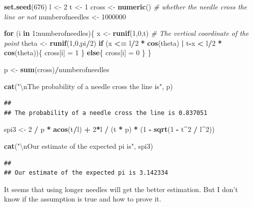 \documentclass[]{article}
\newenvironment{Shaded}{\begin{snugshade}}{\end{snugshade}}
\newcommand{\KeywordTok}[1]{\textcolor[rgb]{0.13,0.29,0.53}{\textbf{#1}}}
\newcommand{\DecValTok}[1]{\textcolor[rgb]{0.00,0.00,0.81}{#1}}
\newcommand{\CharTok}[1]{\textcolor[rgb]{0.31,0.60,0.02}{#1}}
\newcommand{\StringTok}[1]{\textcolor[rgb]{0.31,0.60,0.02}{#1}}
\newcommand{\CommentTok}[1]{\textcolor[rgb]{0.56,0.35,0.01}{\textit{#1}}}
\newcommand{\ControlFlowTok}[1]{\textcolor[rgb]{0.13,0.29,0.53}{\textbf{#1}}}
\newcommand{\OperatorTok}[1]{\textcolor[rgb]{0.81,0.36,0.00}{\textbf{#1}}}
\newcommand{\NormalTok}[1]{#1}
\begin{document}
\begin{Shaded}
\begin{Highlighting}[]
\KeywordTok{set.seed}\NormalTok{(}\DecValTok{676}\NormalTok{)}
\NormalTok{l <-}\StringTok{ }\DecValTok{2}
\NormalTok{t <-}\StringTok{ }\DecValTok{1}
\NormalTok{cross <-}\StringTok{ }\KeywordTok{numeric}\NormalTok{() }\CommentTok{# whether the needle cross the line or not}
\NormalTok{numberofneedles <-}\StringTok{ }\DecValTok{1000000}

\ControlFlowTok{for}\NormalTok{ (i }\ControlFlowTok{in} \DecValTok{1}\OperatorTok{:}\NormalTok{numberofneedles)\{}
\NormalTok{  x <-}\StringTok{ }\KeywordTok{runif}\NormalTok{(}\DecValTok{1}\NormalTok{,}\DecValTok{0}\NormalTok{,t) }\CommentTok{# The vertical coordinate of the point}
\NormalTok{  theta <-}\StringTok{ }\KeywordTok{runif}\NormalTok{(}\DecValTok{1}\NormalTok{,}\DecValTok{0}\NormalTok{,pi}\OperatorTok{/}\DecValTok{2}\NormalTok{)}
  \ControlFlowTok{if}\NormalTok{ (x }\OperatorTok{<=}\StringTok{ }\NormalTok{l}\OperatorTok{/}\DecValTok{2} \OperatorTok{*}\StringTok{ }\KeywordTok{cos}\NormalTok{(theta) }\OperatorTok{|}\StringTok{ }\NormalTok{t}\OperatorTok{-}\NormalTok{x }\OperatorTok{<}\StringTok{ }\NormalTok{l}\OperatorTok{/}\DecValTok{2} \OperatorTok{*}\StringTok{ }\KeywordTok{cos}\NormalTok{(theta))\{}
\NormalTok{    cross[i] =}\StringTok{ }\DecValTok{1}
\NormalTok{  \}}
  \ControlFlowTok{else}\NormalTok{\{}
\NormalTok{    cross[i] =}\StringTok{ }\DecValTok{0}
\NormalTok{  \}}
\NormalTok{\}}

\NormalTok{p <-}\StringTok{ }\KeywordTok{sum}\NormalTok{(cross)}\OperatorTok{/}\NormalTok{numberofneedles}

\KeywordTok{cat}\NormalTok{(}\StringTok{"}\CharTok{\textbackslash{}n}\StringTok{The probability of a needle cross the line is"}\NormalTok{, p)}
\end{Highlighting}
\end{Shaded}

\begin{verbatim}
## 
## The probability of a needle cross the line is 0.837051
\end{verbatim}

\begin{Shaded}
\begin{Highlighting}[]
\NormalTok{spi3 <-}\StringTok{ }\DecValTok{2} \OperatorTok{/}\StringTok{ }\NormalTok{p }\OperatorTok{*}\StringTok{ }\KeywordTok{acos}\NormalTok{(t}\OperatorTok{/}\NormalTok{l) }\OperatorTok{+}\StringTok{ }\DecValTok{2}\OperatorTok{*}\NormalTok{l }\OperatorTok{/}\StringTok{ }\NormalTok{(t }\OperatorTok{*}\StringTok{ }\NormalTok{p) }\OperatorTok{*}\StringTok{ }\NormalTok{(}\DecValTok{1} \OperatorTok{-}\StringTok{ }\KeywordTok{sqrt}\NormalTok{(}\DecValTok{1} \OperatorTok{-}\StringTok{ }\NormalTok{t}\OperatorTok{^}\DecValTok{2} \OperatorTok{/}\StringTok{ }\NormalTok{l}\OperatorTok{^}\DecValTok{2}\NormalTok{))}

\KeywordTok{cat}\NormalTok{(}\StringTok{"}\CharTok{\textbackslash{}n}\StringTok{Our estimate of the expected pi is"}\NormalTok{, spi3)}
\end{Highlighting}
\end{Shaded}

\begin{verbatim}
## 
## Our estimate of the expected pi is 3.142334
\end{verbatim}

It seems that using longer needles will get the better estimation. But I
don't know if the assumption is true and how to prove it.
\end{document}
